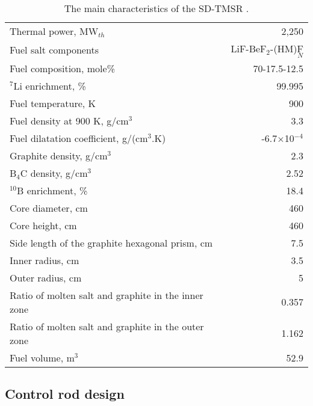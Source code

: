 \begin{table}  %
	\caption{The main characteristics of the SD-TMSR \cite{li_optimization_2018,ashraf2020whole}.}
	\vspace{0.1in}
	\begin{tabularx}{\textwidth}{l | r}
		\hline
		Thermal power, MW$_{th}$          				&  2,250  \\ 
		Fuel salt components                            & LiF-BeF$_2$-(\gls{HM})F$_N$ \\
		Fuel composition, mole\%                        & 70-17.5-12.5    \\
		$^7$Li enrichment, \%        				& 99.995   \\
		Fuel temperature, K 							& 900  \\
		Fuel density at 900 K, g/cm$^3$		  		& 3.3 \\
		Fuel dilatation coefficient, g/(cm$^3$$.$K)  &  -6.7$\times$10$^{-4}$ \\
		Graphite density, g/cm$^3$             	    & 2.3	\\  
		B$_4$C density, g/cm$^3$					& 2.52  \\
		$^{10}$B enrichment, \%						&  18.4  \\
		Core diameter, cm								& 460  \\
		Core height, cm									& 460  \\
		Side length of the graphite hexagonal prism, cm   & 7.5 \\
		Inner radius, cm							& 3.5  \\
		Outer radius, cm							& 5  \\
		Ratio of molten salt and graphite in the inner zone	&  0.357  \\
		Ratio of molten salt and graphite in the outer zone &  1.162  \\
		Fuel volume, m$^3$  &	52.9 \\
		\hline
	\end{tabularx}
	\label{tab:table1}
\end{table}


\subsection{Control rod design} \label{CRD}


